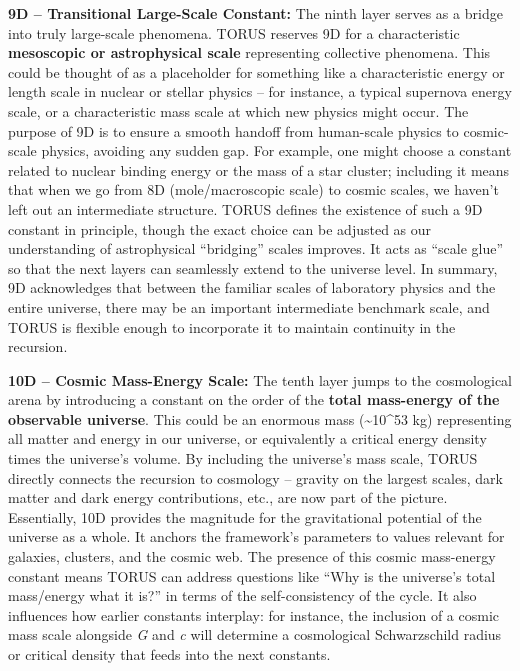 \documentclass[
]{article}
\begin{document}
\textbf{9D -- Transitional Large-Scale Constant:} The ninth layer serves
as a bridge into truly large-scale phenomena. TORUS reserves 9D for a
characteristic \textbf{mesoscopic or astrophysical scale} representing
collective phenomena. This could be thought of as a placeholder for
something like a characteristic energy or length scale in nuclear or
stellar physics -- for instance, a typical supernova energy scale, or a
characteristic mass scale at which new physics might occur. The purpose
of 9D is to ensure a smooth handoff from human-scale physics to
cosmic-scale physics, avoiding any sudden gap. For example, one might
choose a constant related to nuclear binding energy or the mass of a
star cluster; including it means that when we go from 8D
(mole/macroscopic scale) to cosmic scales, we haven't left out an
intermediate structure. TORUS defines the existence of such a 9D
constant in principle, though the exact choice can be adjusted as our
understanding of astrophysical ``bridging'' scales improves. It acts as
``scale glue'' so that the next layers can seamlessly extend to the
universe level. In summary, 9D acknowledges that between the familiar
scales of laboratory physics and the entire universe, there may be an
important intermediate benchmark scale, and TORUS is flexible enough to
incorporate it to maintain continuity in the recursion.

\textbf{10D -- Cosmic Mass-Energy Scale:} The tenth layer jumps to the
cosmological arena by introducing a constant on the order of the
\textbf{total mass-energy of the observable universe}. This could be an
enormous mass (\textasciitilde10\^{}53 kg) representing all matter and
energy in our universe, or equivalently a critical energy density times
the universe's volume. By including the universe's mass scale, TORUS
directly connects the recursion to cosmology -- gravity on the largest
scales, dark matter and dark energy contributions, etc., are now part of
the picture. Essentially, 10D provides the magnitude for the
gravitational potential of the universe as a whole. It anchors the
framework's parameters to values relevant for galaxies, clusters, and
the cosmic web. The presence of this cosmic mass-energy constant means
TORUS can address questions like ``Why is the universe's total
mass/energy what it is?'' in terms of the self-consistency of the cycle.
It also influences how earlier constants interplay: for instance, the
inclusion of a cosmic mass scale alongside \emph{G} and \emph{c} will
determine a cosmological Schwarzschild radius or critical density that
feeds into the next constants.
\end{document}
